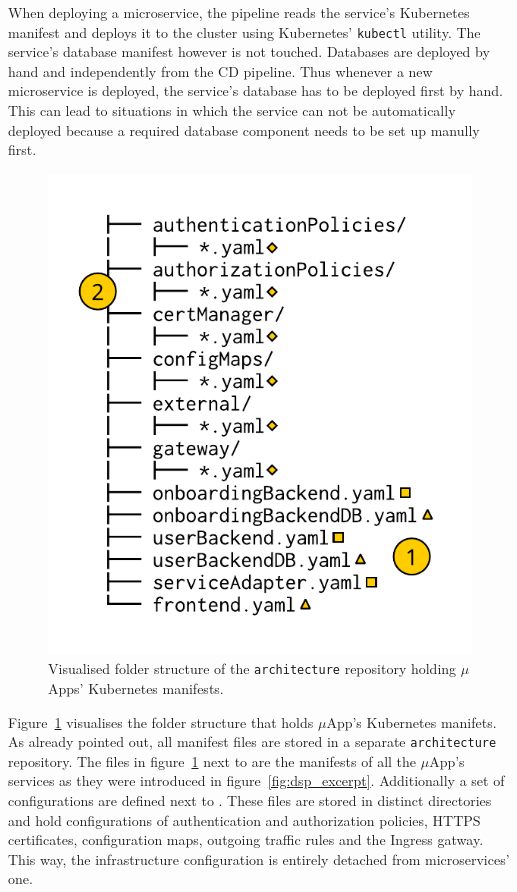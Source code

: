 When deploying a microservice, the pipeline reads the service's Kubernetes
manifest and deploys it to the cluster using Kubernetes' \texttt{kubectl}
utility. The service's database manifest however is not touched. Databases are
deployed by hand and independently from the \ac{CD} pipeline. Thus whenever a
new microservice is deployed, the service's database has to be deployed first
by hand. This can lead to situations in which the service can not be
automatically deployed because a required database component needs to be set up
manully first.

\begin{figure}[H]
\begin{center}
  \includegraphics[scale=0.8]{images/figures/manifests_folder_naive.pdf}
\end{center}
\caption{Visualised folder structure of the \texttt{architecture} repository
holding $\mu$Apps' Kubernetes manifests.}%
\label{fig:manifests_folder_naive}
\end{figure}

Figure~\ref{fig:manifests_folder_naive} visualises the folder structure that
holds $\mu$App's Kubernetes manifets. As already pointed out, all manifest
files are stored in a separate \texttt{architecture} repository. The files in
figure~\ref{fig:manifests_folder_naive} next to  are the manifests
of all the $\mu$App's services as they were introduced in
figure~\ref{fig:dsp_excerpt}. Additionally a set of configurations are defined
next to . These files are stored in distinct directories and hold
configurations of authentication and authorization policies, \ac{HTTPS}
certificates, configuration maps, outgoing traffic rules and the Ingress
gatway. This way, the infrastructure configuration is entirely detached from
microservices' one.

